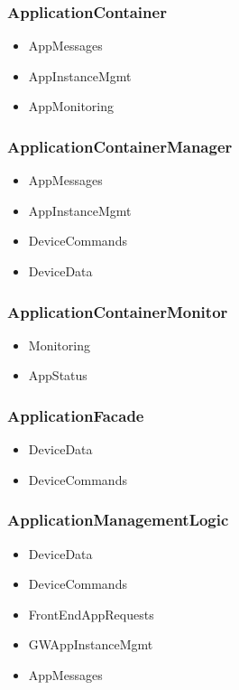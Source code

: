     \subsubsection{ApplicationContainer}
        \begin{itemize}
            \item AppMessages
            \item AppInstanceMgmt
            \item AppMonitoring
        \end{itemize}

    \subsubsection{ApplicationContainerManager}
        \begin{itemize}
            \item AppMessages
            \item AppInstanceMgmt
            \item DeviceCommands
            \item DeviceData
        \end{itemize}

    \subsubsection{ApplicationContainerMonitor}
        \begin{itemize}
            \item Monitoring
            \item AppStatus
        \end{itemize}

    \subsubsection{ApplicationFacade}
        \begin{itemize}
            \item DeviceData
            \item DeviceCommands
        \end{itemize}

    \subsubsection{ApplicationManagementLogic}
        \begin{itemize}
            \item DeviceData
            \item DeviceCommands
            \item FrontEndAppRequests
            \item GWAppInstanceMgmt
            \item AppMessages
        \end{itemize}

